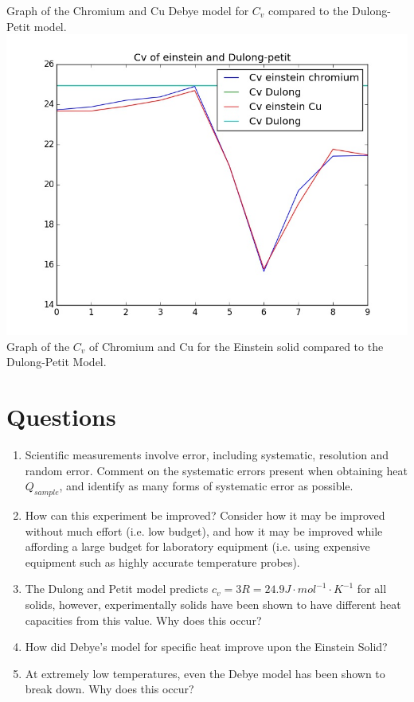\documentclass[12pt]{report}
\begin{document}
Graph of the Chromium and Cu Debye model for $C_v$ compared to the Dulong-Petit model.\\
\includegraphics[scale=0.5]{chromium_einstein}\\
Graph of the $C_v$ of Chromium and Cu for the Einstein solid compared to the Dulong-Petit Model.
\section{Questions}
	\begin{enumerate}
		\item Scientific measurements involve error, including systematic, resolution and
			random error. Comment on the systematic errors present when obtaining
			heat $Q_{sample}$, and identify as many forms of systematic error as possible.
		\item How can this experiment be improved? Consider how it may be improved
			without much effort (i.e. low budget), and how it may be improved while
			affording a large budget for laboratory equipment (i.e. using expensive
			equipment such as highly accurate temperature probes).
		\item The Dulong and Petit model predicts $c_v = 3R = 24.9 J\cdot mol^{-1} \cdot K^{-1}$ for all solids,
			however, experimentally solids have been shown to have different heat
			capacities from this value. Why does this occur?
		\item How did Debye’s model for specific heat improve upon the Einstein Solid?
		\item At extremely low temperatures, even the Debye model has been shown to
			break down. Why does this occur?
	\end{enumerate}
\end{document}
